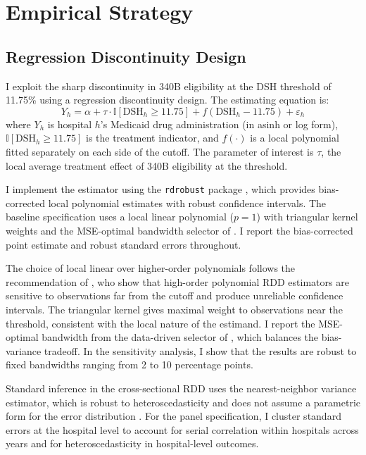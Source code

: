 \documentclass[12pt]{article}
\newcommand{\ind}{\mathbb{I}}
\begin{document}
\section{Empirical Strategy}

\subsection{Regression Discontinuity Design}

I exploit the sharp discontinuity in 340B eligibility at the DSH threshold of 11.75\% using a regression discontinuity design. The estimating equation is:
\begin{equation}
Y_h = \alpha + \tau \cdot \ind[\text{DSH}_h \geq 11.75] + f(\text{DSH}_h - 11.75) + \varepsilon_h
\label{eq:rdd}
\end{equation}
where $Y_h$ is hospital $h$'s Medicaid drug administration (in asinh or log form), $\ind[\text{DSH}_h \geq 11.75]$ is the treatment indicator, and $f(\cdot)$ is a local polynomial fitted separately on each side of the cutoff. The parameter of interest is $\tau$, the local average treatment effect of 340B eligibility at the threshold.

I implement the estimator using the \texttt{rdrobust} package \citep{calonico2014robust, calonico2020rdrobust}, which provides bias-corrected local polynomial estimates with robust confidence intervals. The baseline specification uses a local linear polynomial ($p=1$) with triangular kernel weights and the MSE-optimal bandwidth selector of \citet{calonico2014robust}. I report the bias-corrected point estimate and robust standard errors throughout.

The choice of local linear over higher-order polynomials follows the recommendation of \citet{gelman2019high}, who show that high-order polynomial RDD estimators are sensitive to observations far from the cutoff and produce unreliable confidence intervals. The triangular kernel gives maximal weight to observations near the threshold, consistent with the local nature of the estimand. I report the MSE-optimal bandwidth from the data-driven selector of \citet{calonico2014robust}, which balances the bias-variance tradeoff. In the sensitivity analysis, I show that the results are robust to fixed bandwidths ranging from 2 to 10 percentage points.

Standard inference in the cross-sectional RDD uses the nearest-neighbor variance estimator, which is robust to heteroscedasticity and does not assume a parametric form for the error distribution \citep{imbens2008regression}. For the panel specification, I cluster standard errors at the hospital level to account for serial correlation within hospitals across years and for heteroscedasticity in hospital-level outcomes.
\end{document}

